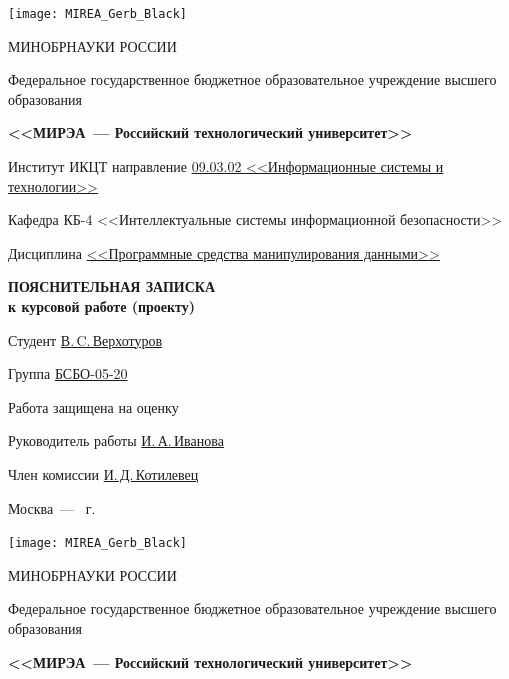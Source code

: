 \documentclass{mirea}
\begin{document}
\begin{titlepage}
		\newpage
		\begin{center}
			\texttt{[image: MIREA\_Gerb\_Black]} \par
			МИНОБРНАУКИ РОССИИ \par 
			Федеральное государственное бюджетное образовательное учреждение высшего образования \par
			\textbf{<<МИРЭА~--- Российский технологический университет>>} \par
		\end{center}
		
		Институт ИКЦТ направление \underline{09.03.02 <<Информационные системы и технологии>>}
		
		Кафедра КБ-4 <<Интеллектуальные системы информационной безопасности>>
		
		Дисциплина \underline{<<Программные средства манипулирования данными>>}
		
		\begin{center}
			\vspace*{1cm}
			{\fontsize{16pt}{16pt}\selectfont
				\textbf{ПОЯСНИТЕЛЬНАЯ ЗАПИСКА \\ к курсовой работе (проекту) }} \par
		\end{center}
	
		Студент \underline{В.\,C.\,Верхотуров} \par\vspace*{.3cm}
		Группа \underline{БСБО-05-20} \par\vspace*{.3cm}
		Работа защищена на оценку \underline{\hspace*{5cm}} \par\vspace*{.3cm}
		Руководитель работы	\underline{И.\,А.\,Иванова} \par\vspace*{.3cm}
		Член комиссии \underline{И.\,Д.\,Котилевец}
		\begin{center}
			\vfill Москва~--- \the\year{}~г.
		\end{center}
	
		\newpage
		\begin{center}
			\texttt{[image: MIREA\_Gerb\_Black]} \par
			МИНОБРНАУКИ РОССИИ \par 
			Федеральное государственное бюджетное образовательное учреждение высшего образования \par
			\textbf{<<МИРЭА~--- Российский технологический университет>>} \par
		\end{center}
	

\end{titlepage}
\end{document}
